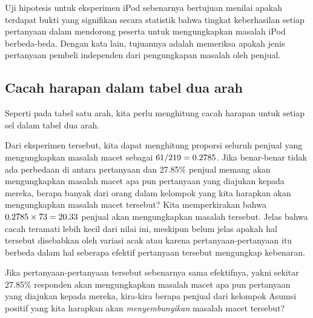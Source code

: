 Uji hipotesis untuk eksperimen iPod sebenarnya bertujuan
menilai apakah terdapat bukti yang signifikan secara statistik
bahwa tingkat keberhasilan setiap pertanyaan dalam mendorong peserta
untuk mengungkapkan masalah iPod berbeda-beda.
Dengan kata lain, tujuannya adalah memeriksa apakah jenis
pertanyaan pembeli independen dari pengungkapan
masalah oleh penjual.



\subsection{Cacah harapan dalam tabel dua arah}

\noindent%
Seperti pada tabel satu arah, kita perlu menghitung
cacah harapan untuk setiap sel dalam tabel dua arah.

\begin{examplewrap}
\begin{nexample}{Dari eksperimen tersebut,
    kita dapat menghitung proporsi seluruh penjual yang mengungkapkan
    masalah macet sebagai $61{}/219 = 0.2785{}$.
    Jika benar-benar tidak ada perbedaan di antara pertanyaan
    dan 27.85\% penjual memang akan mengungkapkan masalah
    macet apa pun pertanyaan yang diajukan kepada mereka,
    berapa banyak dari \iPodDA{} orang dalam kelompok 
    yang kita harapkan akan mengungkapkan masalah
    macet tersebut?} \label{iPodExComputeExpAA}
  Kita memperkirakan bahwa $0.2785{} \times 73{} = 20.33{}$
  penjual akan mengungkapkan masalah tersebut.
  Jelas bahwa cacah teramati lebih kecil dari nilai ini, meskipun belum
  jelas apakah hal tersebut disebabkan oleh variasi acak atau karena
  pertanyaan-pertanyaan itu berbeda dalam hal seberapa efektif
  pertanyaan tersebut mengungkap kebenaran.
\end{nexample}
\end{examplewrap}

\begin{exercisewrap}
\begin{nexercise}\label{iPodExComputeExpBB}
Jika pertanyaan-pertanyaan tersebut sebenarnya sama efektifnya,
yakni sekitar 27.85\% responden akan mengungkapkan
masalah macet apa pun pertanyaan yang diajukan kepada mereka,
kira-kira berapa penjual dari kelompok Asumsi positif
yang kita harapkan akan \emph{menyembunyikan} masalah
macet tersebut?\footnotemark
\end{nexercise}
\end{exercisewrap}

